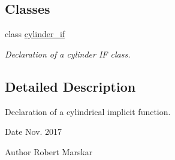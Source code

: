\subsection*{Classes}
\begin{DoxyCompactItemize}
\item 
class \hyperlink{classcylinder__if}{cylinder\+\_\+if}
\begin{DoxyCompactList}\small\item\em Declaration of a cylinder IF class. \end{DoxyCompactList}\end{DoxyCompactItemize}


\subsection{Detailed Description}
Declaration of a cylindrical implicit function. 

\begin{DoxyDate}{Date}
Nov. 2017 
\end{DoxyDate}
\begin{DoxyAuthor}{Author}
Robert Marskar 
\end{DoxyAuthor}
